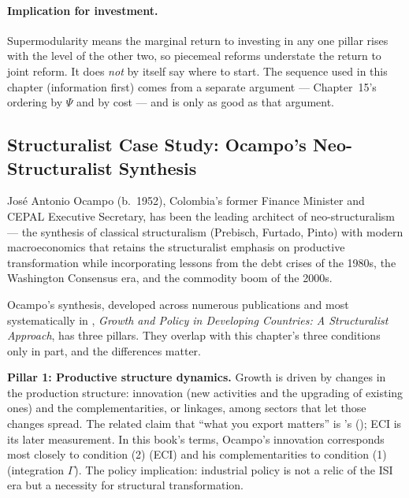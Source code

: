 \documentclass[../structural_economics_book.tex]{subfiles}
\begin{document}
\paragraph{Implication for investment.} Supermodularity means the marginal return to investing in any one pillar rises with the level of the other two, so piecemeal reforms understate the return to joint reform. It does \emph{not} by itself say where to start. The sequence used in this chapter (information first) comes from a separate argument --- Chapter~15's ordering by $\Psi$ and by cost --- and is only as good as that argument.


\subsection*{Structuralist Case Study: Ocampo's Neo-Structuralist Synthesis}

Jos\'{e} Antonio Ocampo (b.\ 1952), Colombia's former Finance Minister and CEPAL Executive Secretary, has been the leading architect of neo-structuralism --- the synthesis of classical structuralism (Prebisch, Furtado, Pinto) with modern macroeconomics that retains the structuralist emphasis on productive transformation while incorporating lessons from the debt crises of the 1980s, the Washington Consensus era, and the commodity boom of the 2000s.

Ocampo's synthesis, developed across numerous publications and most systematically in \citet{ocampo2009growth}, \textit{Growth and Policy in Developing Countries: A Structuralist Approach}, has three pillars. They overlap with this chapter's three conditions only in part, and the differences matter.

\textbf{Pillar 1: Productive structure dynamics.} Growth is driven by changes in the production structure: innovation (new activities and the upgrading of existing ones) and the complementarities, or linkages, among sectors that let those changes spread. The related claim that ``what you export matters'' is \citeauthor{hausmann2007what}'s (\citeyear{hausmann2007what}); ECI is its later measurement. In this book's terms, Ocampo's innovation corresponds most closely to condition (2) (ECI) and his complementarities to condition (1) (integration $\Gamma$). The policy implication: industrial policy is not a relic of the ISI era but a necessity for structural transformation.
\end{document}
